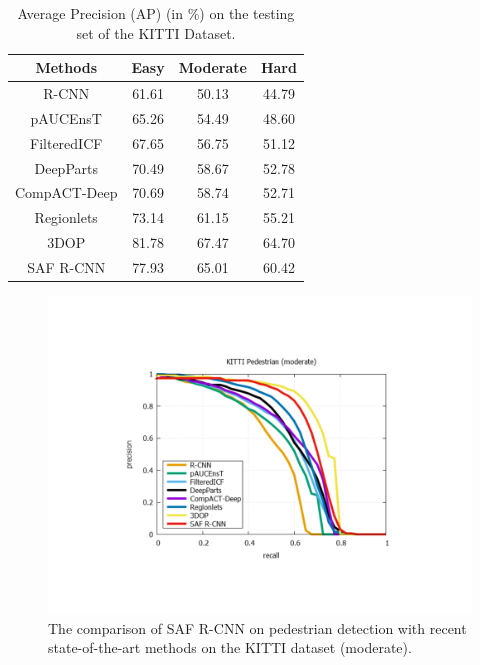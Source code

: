 \documentclass[journal]{IEEEtran}
\begin{document}

\begin{table}\setlength{\tabcolsep}{3pt}
	\centering\scriptsize
	\caption{Average Precision (AP) (in \%) on the testing set of the KITTI Dataset.}\label{tab:Kitti_Results}
	\renewcommand{\arraystretch}{1.3}
	\begin{tabular}{c | c | c | c}
		\hline
		{\bf Methods} & {\bf Easy} & {\bf Moderate} & {\bf Hard}\\ \hline
		R-CNN & 61.61 & 50.13 & 44.79 \\
		pAUCEnsT & 65.26 & 54.49 & 48.60 \\
		FilteredICF & 67.65 & 56.75 & 51.12 \\
		DeepParts & 70.49 & 58.67 & 52.78 \\
		CompACT-Deep & 70.69 & 58.74 & 52.71 \\
		Regionlets & 73.14 & 61.15 & 55.21 \\		
		3DOP & 81.78 & 67.47 & 64.70 \\	\hline			
		SAF R-CNN & 77.93 & 65.01 & 60.42 \\				
		\hline
	\end{tabular}%
\end{table}%

\begin{figure}
	\begin{center}
		\includegraphics[scale=0.50]{figures/Kitti_Results.pdf}
		\caption{The comparison of SAF R-CNN on pedestrian detection with recent state-of-the-art methods on the KITTI dataset (moderate).}	
		\label{fig:Kitti_Results}
	\end{center}
	\vspace{-4mm}
\end{figure}
\end{document}
